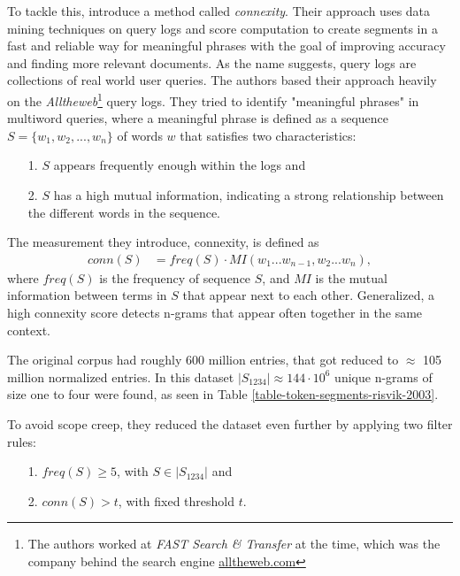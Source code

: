 To tackle this, \citeauthor{Risvik:2003} introduce a method called \textit{connexity}. Their approach uses data mining techniques on query logs and score computation to create segments in a fast and reliable way for meaningful phrases with the goal of improving accuracy and finding more relevant documents. As the name suggests, query logs are collections of real world user queries. The authors based their approach heavily on the \textit{Alltheweb}\footnote{The authors worked at \textit{FAST Search \& Transfer} at the time, which was the company behind the search engine \url{alltheweb.com}} query logs. They tried to identify "meaningful phrases" in multiword queries, where a meaningful phrase is defined as a sequence $S = \{w_1,w_2,...,w_n\}$ of words $w$ that satisfies two characteristics:
\begin{enumerate}
\item[1.] $S$ appears frequently enough within the logs and
\item[2.] $S$ has a high mutual information, indicating a strong relationship between the different words in the sequence.
\end{enumerate}

The measurement they introduce, connexity, is defined as
\begin{align*}
conn(S) &= freq(S) \cdot MI(w_1...w_{n-1},w_2...w_n),
\end{align*}
where $freq(S)$ is the frequency of sequence $S$, and $MI$ is the mutual information between terms in $S$ that appear next to each other.
Generalized, a high connexity score detects n-grams that appear often together in the same context.



The original corpus had roughly 600 million entries, that got reduced to $\approx$ 105 million normalized entries. In this dataset $|S_{1234}| \approx 144 \cdot 10^6$ unique n-grams of size one to four were found, as seen in Table \ref{table-token-segments-risvik-2003}.


To avoid scope creep, they reduced the dataset even further by applying two filter rules:
\begin{enumerate}
\item[1.] $freq(S) \ge 5$, with $S \in |S_{1234}|$ and
\item[2.] $conn(S) > t$, with fixed threshold $t$.
\end{enumerate}

